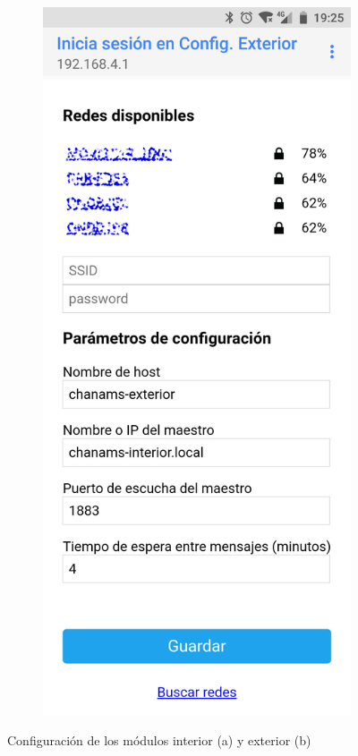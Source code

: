 \begin{figure}
\begin{subfigure}{0.49\columnwidth}
  \caption{}
  \label{fig:interior-config}
\end{subfigure}
\hfill
\begin{subfigure}{0.49\columnwidth}
  \centering
  \includegraphics[width=0.9\columnwidth,frame]{images/exterior-config}
  \caption{}
  \label{fig:exterior-config}
\end{subfigure}
\caption{Configuración de los módulos interior (a) y exterior (b)}
\end{figure}

